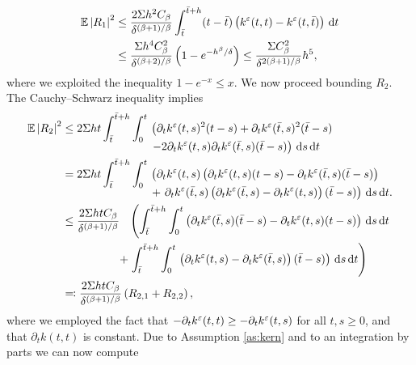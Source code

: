 \documentclass[10pt]{article}
\begin{document}
\begin{equation}
\begin{aligned}
\operatorname{\mathbb{E}} \left\lvert R_1\right\rvert^2 &\leq \frac{2\Sigma h^2 C_\beta}{\delta^{(\beta+1)/\beta}}\int_{\bar t}^{\bar t + h}(t - \bar t) \left(k^\varepsilon(t, t) - k^\varepsilon(t, \bar t)\right) \,\mathrm{d} t\\
&\leq \frac{\Sigma h^4 C_\beta^2}{\delta^{(\beta+2)/\beta}}\left(1 - e^{-h^\beta / \delta}\right) \leq \frac{\Sigma C_\beta^2}{\delta^{2(\beta+1)/\beta}} h^5,
\end{aligned}
\end{equation}
where we exploited the inequality $1-e^{-x} \leq x$. We now proceed bounding $R_2$. The Cauchy--Schwarz inequality implies
\begin{equation}
\begin{aligned}
\operatorname{\mathbb{E}}\left\lvert R_2\right\rvert^2 &\leq 2 \Sigma ht \int_{\bar t}^{\bar t + h}\int_0^t 
\begin{aligned}[t]
&\left(\partial_t k^\varepsilon(t, s)^2 (t-s)  + \partial_t k^\varepsilon(\bar t, s)^2 (\bar t-s)\right.\\
&\left. -2 \partial_t k^\varepsilon(t, s) \partial_t k^\varepsilon(\bar t, s)(\bar t - s)\right) \,\mathrm{d} s \,\mathrm{d} t
\end{aligned}
\\
&= 2 \Sigma ht \int_{\bar t}^{\bar t + h}\int_0^t 
\begin{aligned}[t]
&\left(\partial_t k^\varepsilon(t, s)\left(\partial_t k^\varepsilon(t, s)(t-s) -\partial_t k^\varepsilon(\bar t, s)(\bar t - s)\right)\right.\\
&+ \left.  \partial_t k^\varepsilon(\bar t, s)\left(\partial_t k^\varepsilon(\bar t, s)- \partial_t k^\varepsilon(t, s) \right)(\bar t - s) \right) \,\mathrm{d} s \,\mathrm{d} t.
\end{aligned}
\\
&\leq \frac{2 \Sigma ht C_\beta}{\delta^{(\beta + 1)/\beta}} 
\begin{aligned}[t]
&\left( \int_{\bar t}^{\bar t + h}\int_0^t \left(\partial_t k^\varepsilon(\bar t, s)(\bar t - s) - \partial_t k^\varepsilon(t, s)(t-s) \right) \,\mathrm{d} s \,\mathrm{d} t \right. \\
+ & \left. \int_{\bar t}^{\bar t + h}\int_0^t \left. \left(\partial_t k^\varepsilon(t, s) - \partial_t k^\varepsilon(\bar t, s)\right)(\bar t - s) \right) \,\mathrm{d} s \,\mathrm{d} t \right) 
\end{aligned}
\\
&\eqqcolon \frac{2 \Sigma ht C_\beta}{\delta^{(\beta + 1)/\beta}}\left(R_{2,1} + R_{2,2}\right),
\end{aligned}
\end{equation}
where we employed the fact that $-\partial_t k^\varepsilon(t, t) \geq -\partial_t k^\varepsilon(t, s)$ for all $t,s \geq 0$, and that $\partial_t k(t,t)$ is constant. Due to Assumption \ref{as:kern} and to an integration by parts we can now compute
\end{document}
